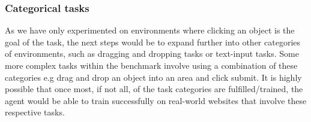 \documentclass[10pt,journal,compsoc]{IEEEtran}
\begin{document}
\subsubsection{Categorical tasks}
As we have only experimented on environments where clicking an object is the goal of the task, the next steps would be to expand further into other categories of environments, such as dragging and dropping tasks or text-input tasks. Some more complex tasks within the benchmark involve using a combination of these categories e.g drag and drop an object into an area and click submit. It is highly possible that once most, if not all, of the task categories are fulfilled/trained, the agent would be able to train successfully on real-world websites that involve these respective tasks.






%
%

\end{document}
